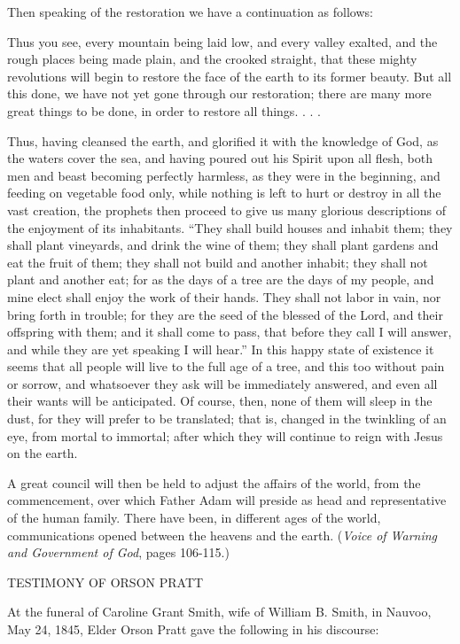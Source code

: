 Then speaking of the restoration we have a continuation as follows:

Thus you see, every mountain being laid low, and every valley exalted, and the rough places
being made plain, and the crooked straight, that these mighty revolutions will begin to restore
the face of the earth to its former beauty. But all this done, we have not yet gone through our
restoration; there are many more great things to be done, in order to restore all things. . . .

Thus, having cleansed the earth, and glorified it with the knowledge of God, as the waters
cover the sea, and having poured out his Spirit upon all flesh, both men and beast becoming
perfectly harmless, as they were in the beginning, and feeding on vegetable food only, while
nothing is left to hurt or destroy in all the vast creation, the prophets then proceed to give us
many glorious descriptions of the enjoyment of its inhabitants. ``They shall build houses and
inhabit them; they shall plant vineyards, and drink the wine of them; they shall plant gardens
and eat the fruit of them; they shall not build and another inhabit; they shall not plant and
another eat; for as the days of a tree are the days of my people, and mine elect shall enjoy the
work of their hands. They shall not labor in vain, nor bring forth in trouble; for they are the
seed of the blessed of the Lord, and their offspring with them; and it shall come to pass, that
before they call I will answer, and while they are yet speaking I will hear.'' In this happy state
of existence it seems that all people will live to the full age of a tree, and this too without
pain or sorrow, and whatsoever they ask will be immediately answered, and even all their
wants will be anticipated. Of course, then, none of them will sleep in the dust, for they will
prefer to be translated; that is, changed in the twinkling of an eye, from mortal to immortal;
after which they will continue to reign with Jesus on the earth.

A great council will then be held to adjust the affairs of the world, from the commencement,
over which Father Adam will preside as head and representative of the human family. There
have been, in different ages of the world, communications opened between the heavens and
the earth. (\textit{Voice of Warning and Government of God}, pages 106-115.)

TESTIMONY OF ORSON PRATT

At the funeral of Caroline Grant Smith, wife of William B. Smith, in Nauvoo, May 24, 1845,
Elder Orson Pratt gave the following in his discourse:

